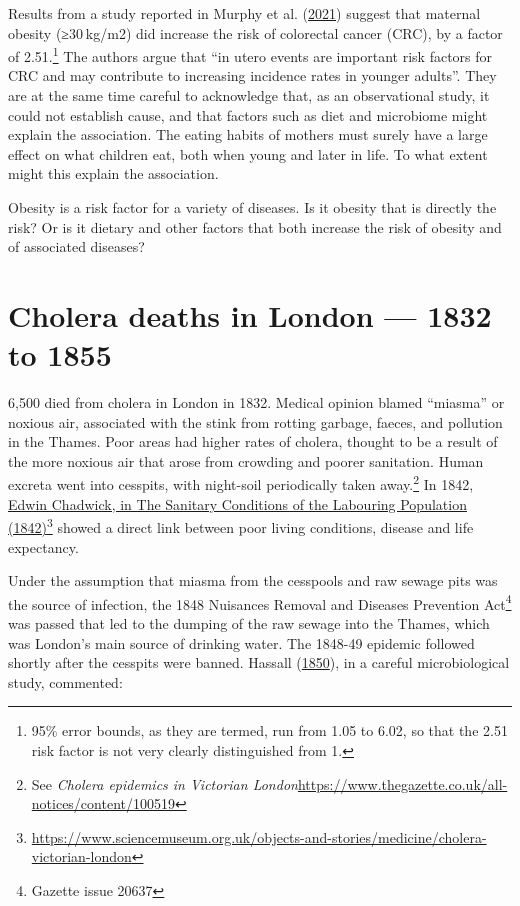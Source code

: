 \documentclass[
  10pt,
  b5paper]{book}
\begin{document}
Results from a study reported in Murphy et al. (\protect\hyperlink{ref-Murphygutjnl-2021-325001}{2021}) suggest
that maternal obesity (≥30 kg/m2) did increase the risk of
colorectal cancer (CRC), by a factor of 2.51.\footnote{95\%
  error bounds, as they are termed, run from 1.05 to 6.02,
  so that the 2.51 risk factor is not very clearly distinguished
  from 1.} The authors argue that ``in utero events are important
risk factors for CRC and may contribute to increasing incidence
rates in younger adults''. They are at the same time careful to
acknowledge that, as an observational study, it could not
establish cause, and that factors such as diet and microbiome
might explain the association. The eating habits of mothers
must surely have a large effect on what children eat, both when
young and later in life. To what extent might this explain
the association.

Obesity is a risk factor for a variety of diseases. Is it
obesity that is directly the risk? Or is it dietary and
other factors that both increase the risk of obesity and
of associated diseases?

\hypertarget{cholera-deaths-in-london-1832-to-1855}{%
\section{Cholera deaths in London --- 1832 to 1855}\label{cholera-deaths-in-london-1832-to-1855}}

6,500 died from cholera in London in 1832. Medical opinion
blamed ``miasma'' or noxious air, associated with the stink
from rotting garbage, faeces, and pollution in the Thames.
Poor areas had higher rates of cholera, thought to be a
result of the more noxious air that arose from crowding
and poorer sanitation. Human excreta
went into cesspits, with night-soil periodically taken
away.\footnote{See \emph{Cholera epidemics in Victorian London}\newline \url{https://www.thegazette.co.uk/all-notices/content/100519}}
In 1842, \href{https://www.sciencemuseum.org.uk/objects-and-stories/medicine/cholera-victorian-london}{Edwin Chadwick, in The Sanitary Conditions of the Labouring Population (1842)}\footnote{\url{https://www.sciencemuseum.org.uk/objects-and-stories/medicine/cholera-victorian-london}}
showed a direct link between poor living conditions,
disease and life expectancy.

Under the assumption that miasma from the cesspools and raw
sewage pits was the source of infection, the 1848 Nuisances
Removal and Diseases Prevention Act\footnote{Gazette issue 20637}
was passed that led to the dumping of the raw sewage into
the Thames, which was London's main source of drinking water.
The 1848-49 epidemic followed shortly after the cesspits
were banned. Hassall (\protect\hyperlink{ref-hassall1850memoir}{1850}), in a careful microbiological
study, commented:
\end{document}
